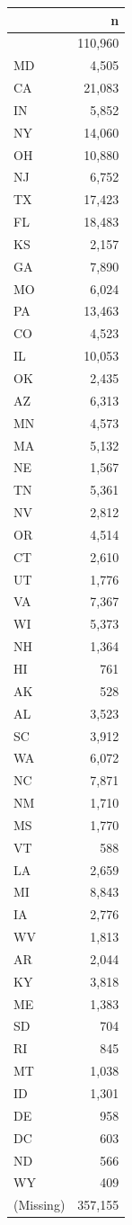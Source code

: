 \documentclass[10pt,article,oneside]{memoir}
\begin{document}
\begin{table}[H]
\centering
\begin{tabular}[t]{lr}
\toprule
 & n\\
\midrule
 & 110,960\\
MD & 4,505\\
CA & 21,083\\
IN & 5,852\\
NY & 14,060\\
OH & 10,880\\
NJ & 6,752\\
TX & 17,423\\
FL & 18,483\\
KS & 2,157\\
GA & 7,890\\
MO & 6,024\\
PA & 13,463\\
CO & 4,523\\
IL & 10,053\\
OK & 2,435\\
AZ & 6,313\\
MN & 4,573\\
MA & 5,132\\
NE & 1,567\\
TN & 5,361\\
NV & 2,812\\
OR & 4,514\\
CT & 2,610\\
UT & 1,776\\
VA & 7,367\\
WI & 5,373\\
NH & 1,364\\
HI & 761\\
AK & 528\\
AL & 3,523\\
SC & 3,912\\
WA & 6,072\\
NC & 7,871\\
NM & 1,710\\
MS & 1,770\\
VT & 588\\
LA & 2,659\\
MI & 8,843\\
IA & 2,776\\
WV & 1,813\\
AR & 2,044\\
KY & 3,818\\
ME & 1,383\\
SD & 704\\
RI & 845\\
MT & 1,038\\
ID & 1,301\\
DE & 958\\
DC & 603\\
ND & 566\\
WY & 409\\
(Missing) & 357,155\\
\bottomrule
\end{tabular}
\end{table}
\end{document}
